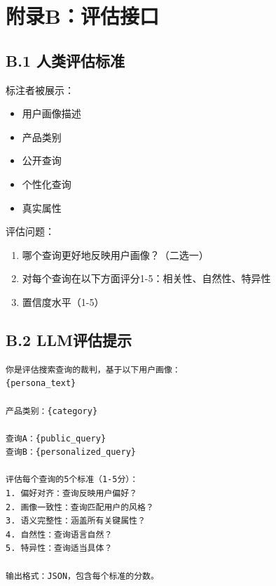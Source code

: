 \documentclass[11pt,a4paper]{article}
\begin{document}
\section*{附录B：评估接口}

\subsection*{B.1 人类评估标准}

标注者被展示：
\begin{itemize}
    \item 用户画像描述
    \item 产品类别
    \item 公开查询
    \item 个性化查询
    \item 真实属性
\end{itemize}

评估问题：
\begin{enumerate}
    \item 哪个查询更好地反映用户画像？（二选一）
    \item 对每个查询在以下方面评分1-5：相关性、自然性、特异性
    \item 置信度水平（1-5）
\end{enumerate}

\subsection*{B.2 LLM评估提示}

\begin{verbatim}
你是评估搜索查询的裁判，基于以下用户画像：
{persona_text}

产品类别：{category}

查询A：{public_query}
查询B：{personalized_query}

评估每个查询的5个标准（1-5分）：
1. 偏好对齐：查询反映用户偏好？
2. 画像一致性：查询匹配用户的风格？
3. 语义完整性：涵盖所有关键属性？
4. 自然性：查询语言自然？
5. 特异性：查询适当具体？

输出格式：JSON，包含每个标准的分数。
\end{verbatim}
\end{document}
